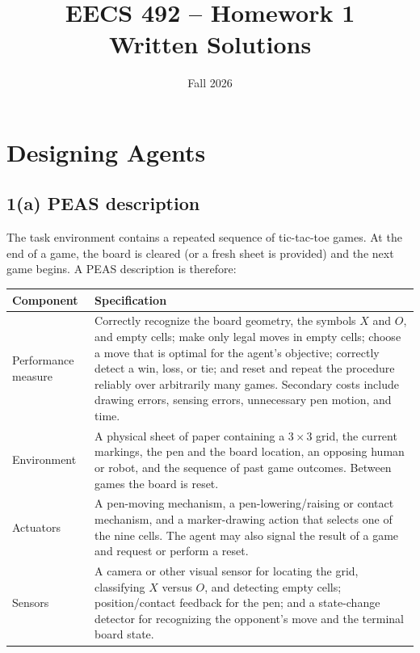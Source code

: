 \documentclass[11pt]{article}
\title{\vspace{-1.5cm}\textbf{EECS 492 -- Homework 1}\\[2pt]
\large Written Solutions}
\author{}
\date{Fall 2026}
\begin{document}
\maketitle
\vspace{-0.8cm}

\section{Designing Agents}

\subsection*{1(a) PEAS description}
The task environment contains a repeated sequence of tic-tac-toe games.  At the
end of a game, the board is cleared (or a fresh sheet is provided) and the next
game begins.  A PEAS description is therefore:

\begin{center}
\begin{tabular}{>{\raggedright\arraybackslash}p{}
                >{\raggedright\arraybackslash}p{}}
\toprule
\textbf{Component} & \textbf{Specification}\\
\midrule
Performance measure &
Correctly recognize the board geometry, the symbols $X$ and $O$, and empty
cells; make only legal moves in empty cells; choose a move that is optimal for
the agent's objective; correctly detect a win, loss, or tie; and reset and
repeat the procedure reliably over arbitrarily many games.  Secondary costs
include drawing errors, sensing errors, unnecessary pen motion, and time.\\
\addlinespace
Environment &
A physical sheet of paper containing a $3\times3$ grid, the current markings,
the pen and the board location, an opposing human or robot, and the sequence of
past game outcomes.  Between games the board is reset.\\
\addlinespace
Actuators &
A pen-moving mechanism, a pen-lowering/raising or contact mechanism, and a
marker-drawing action that selects one of the nine cells.  The agent may also
signal the result of a game and request or perform a reset.\\
\addlinespace
Sensors &
A camera or other visual sensor for locating the grid, classifying $X$ versus
$O$, and detecting empty cells; position/contact feedback for the pen; and a
state-change detector for recognizing the opponent's move and the terminal
board state.\\
\bottomrule
\end{tabular}
\end{center}
\end{document}
